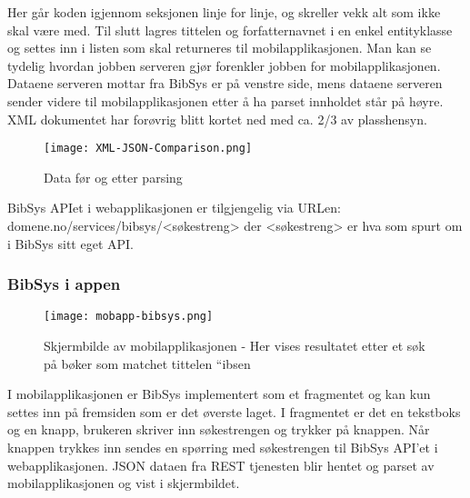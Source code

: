 \documentclass[../main.tex]{subfiles}
\begin{document}
Her går koden igjennom seksjonen linje for linje, og skreller vekk alt som ikke skal være med. Til slutt lagres tittelen og forfatternavnet i en enkel entityklasse og settes inn i listen som skal returneres til mobilapplikasjonen.\newline
\newline
Man kan se tydelig hvordan jobben serveren gjør forenkler jobben for mobilapplikasjonen. Dataene serveren mottar fra BibSys er på venstre side, mens dataene serveren sender videre til mobilapplikasjonen etter å ha parset innholdet står på høyre. XML dokumentet har forøvrig blitt kortet ned med ca. 2/3 av plasshensyn.

\begin{figure}[H]
  \centering
  \texttt{[image: XML-JSON-Comparison.png]}
  \caption{Data før og etter parsing}
\end{figure}

BibSys APIet i webapplikasjonen er tilgjengelig via URLen: domene.no/services/bibsys/<søkestreng> der <søkestreng> er hva som spurt om i BibSys sitt eget API.

\subsubsection{BibSys i appen}

\begin{figure}[H]
  \centering
  \texttt{[image: mobapp-bibsys.png]}
  \caption{Skjermbilde av mobilapplikasjonen - Her vises resultatet etter et søk på bøker som matchet tittelen “ibsen}
\end{figure}

I mobilapplikasjonen er BibSys implementert som et fragmentet og kan kun settes inn på fremsiden som er det øverste laget. I fragmentet er det en tekstboks og en knapp, brukeren skriver inn søkestrengen og trykker på knappen. Når knappen trykkes inn sendes en spørring med søkestrengen til BibSys API’et i webapplikasjonen. JSON dataen fra REST tjenesten blir hentet og parset av mobilapplikasjonen og vist i skjermbildet.

\newpage
\end{document}
